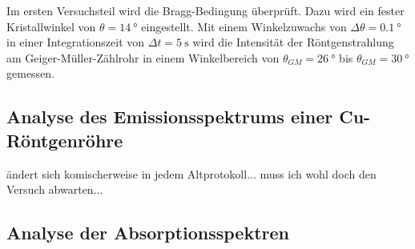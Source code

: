 Im ersten Versuchsteil wird die Bragg-Bedingung überprüft. Dazu wird ein fester Kristallwinkel von $\theta = \qty{14}{\degree}$ eingestellt.
Mit einem Winkelzuwachs von $\Delta\theta = \qty{0.1}{\degree}$ in einer Integrationszeit
von $\Delta t = \qty{5}{\second}$ wird die Intensität der Röntgenstrahlung am Geiger-Müller-Zählrohr in
einem Winkelbereich von $\theta_{GM} = \qty{26}{\degree}$ bis $\theta_{GM} = \qty{30}{\degree}$ gemessen.

\subsection{Analyse des Emissionsspektrums einer Cu-Röntgenröhre} %
\label{sub:Emission_durch}

ändert sich komischerweise in jedem Altprotokoll... muss ich wohl doch den Versuch abwarten...



\subsection{Analyse der Absorptionsspektren} %
\label{sub:Absorption_durch}

